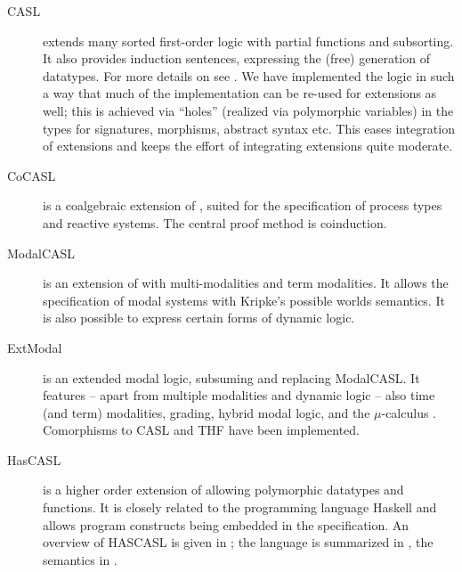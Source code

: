 \documentclass{article}
\newcommand{\normalTEXTSC}[2]{{#1\scriptsize#2}}
\newcommand{\Dolce}{\textmd{\textsc{Dolce}}\xspace}
\newcommand     {\HasCASL}{\normalTEXTSC{H}{AS}\normalTEXTSC{C}{ASL}\xspace}
\begin{document}
\begin{description}

\item[CASL] extends many sorted first-order logic with partial
  functions and subsorting.  It also provides induction sentences,
  expressing the (free) generation of datatypes.
For more details on \CASL see \cite{CASL/RefManual,CASL-UM}.
%
We have implemented the \CASL logic in such a way that much of the
implementation can be re-used for \CASL extensions as well; this
is achieved via ``holes'' (realized via polymorphic variables) in the
types for signatures, morphisms, abstract syntax etc.  This eases
integration of \CASL extensions and keeps the effort of integrating
\CASL extensions quite moderate.

\item[CoCASL] \cite{MossakowskiEA04} is a coalgebraic extension of \CASL,
suited for the specification of process types and reactive systems.
The central proof method is coinduction.

\item[ModalCASL] \cite{ModalCASL}
 is an extension of \CASL with multi-modalities and
term modalities. It allows the specification of modal systems with
Kripke's possible worlds semantics. It is also possible to express
certain forms of dynamic logic.

\item[ExtModal] is an extended modal logic, subsuming and replacing ModalCASL.
  It features -- apart from multiple modalities and dynamic logic -- also time
  (and term) modalities, grading, hybrid modal logic, and the $\mu$-calculus
  \cite{Codruta10}. Comorphisms to CASL and THF have been implemented.

\item[HasCASL] is a higher order extension of \CASL allowing
  polymorphic datatypes and functions. It is closely related to the
  programming language Haskell and allows program constructs being
  embedded in the specification.
  An overview of \HasCASL is given in \cite{Schroeder:2002:HIS};
the language is summarized in \cite{HasCASL/Summary}, the semantics
in \cite{Schroder05b,Schroder-habil}.


\end{description}
\end{document}
